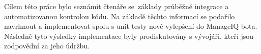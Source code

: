 \indent Cílem této práce bylo seznámit čtenáře se~základy průběžné integrace a automatizovanou kontrolou kódu. Na základě těchto informací se podařilo navrhnout a implementovat spolu s unit testy nové vylepšení do ManageIQ bota. Následně tyto výsledky implementace byly prodiskutovány s vývojáři, kteří jsou zodpovědní za jeho údržbu.
